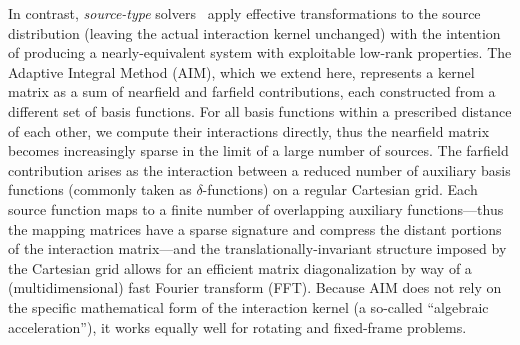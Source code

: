 In contrast, \emph{source-type} solvers~\cite{Bleszynski1996,Yilmaz2004,Kapur1997} apply effective transformations to the source distribution (leaving the actual interaction kernel unchanged) with the intention of producing a nearly-equivalent system with exploitable low-rank properties.
The Adaptive Integral Method (AIM), which we extend here, represents a kernel matrix as a sum of nearfield and farfield contributions, each constructed from a different set of basis functions.
For all basis functions within a prescribed distance of each other, we compute their interactions directly, thus the nearfield matrix becomes increasingly sparse in the limit of a large number of sources.
The farfield contribution arises as the interaction between a reduced number of auxiliary basis functions (commonly taken as $\delta$-functions) on a regular Cartesian grid.
Each source function maps to a finite number of overlapping auxiliary functions---thus the mapping matrices have a sparse signature and compress the distant portions of the interaction matrix---and the translationally-invariant structure imposed by the Cartesian grid allows for an efficient matrix diagonalization by way of a (multidimensional) fast Fourier transform (FFT).
Because AIM does not rely on the specific mathematical form of the interaction kernel (a so-called ``algebraic acceleration''), it works equally well for rotating and fixed-frame problems.

